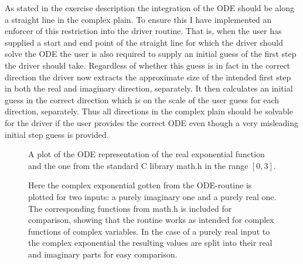 \documentclass[onecolumn]{article}
\begin{document}
As stated in the exercise description the integration of the ODE should be along a straight line in the complex plain. To ensure this I have 
implemented an enforcer of this restriction into the driver routine. That is, when the user has supplied a start and end point of the straight 
line for which the driver should solve the ODE the user is also required to supply an initial guess of the first step the driver should take. 
Regardless of whether this guess is in fact in the correct direction the driver now extracts the approximate size of the intended first step 
in both the real and imaginary direction, separately. It then calculates an initial guess in the correct direction which is on the scale of the 
user guess for each direction, separately. Thus all directions in the complex plain should be solvable for the driver if the user provides 
the correct ODE even though a very misleading initial step guess is provided. 


\begin{figure}

        \caption{A plot of the ODE representation of the real exponential function and the one from the standard C library math.h in the range
                $[0,3]$.}
\label{fig:real}
\end{figure}

\begin{figure}

	\caption{Here the complex exponential gotten from the ODE-routine is plotted for two inputs: a purely imaginary one and a purely real one.
		The corresponding functions from math.h is included for comparison, showing that the routine works as intended for complex
		functions of complex variables. In the case of a purely real input to the complex exponential the resulting values are split into
		their real and imaginary parts for easy comparison.}
\label{fig:complex}
\end{figure}
\end{document}

